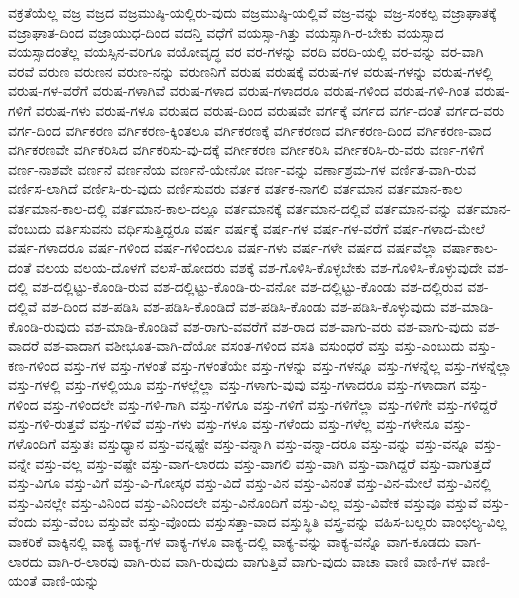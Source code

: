 {ವಕ್ರತೆಯೆಲ್ಲ
ವಜ್ರ
ವಜ್ರದ
ವಜ್ರಮುಷ್ಠಿ-ಯಲ್ಲಿರು-ವುದು
ವಜ್ರಮುಷ್ಠಿ-ಯಲ್ಲಿವೆ
ವಜ್ರ-ವನ್ನು
ವಜ್ರ-ಸಂಕಲ್ಪ
ವಜ್ರಾಘಾತಕ್ಕೆ
ವಜ್ರಾಘಾತ-ದಿಂದ
ವಜ್ರಾಯುಧ-ದಿಂದ
ವದನ್ತಿ
ವಧೆಗೆ
ವಯಸ್ಸಾ-ಗಿತ್ತು
ವಯಸ್ಸಾಗಿ-ರ-ಬೇಕು
ವಯಸ್ಸಾದ
ವಯಸ್ಸಾದಂತೆಲ್ಲ
ವಯಸ್ಸಿನ-ವರಿಗೂ
ವಯೋವೃದ್ಧ
ವರ
ವರ-ಗಳನ್ನು
ವರದಿ
ವರದಿ-ಯಲ್ಲಿ
ವರ-ವನ್ನು
ವರ-ವಾಗಿ
ವರವೆ
ವರುಣ
ವರುಣನ
ವರುಣ-ನನ್ನು
ವರುಣನಿಗೆ
ವರುಷ
ವರುಷಕ್ಕೆ
ವರುಷ-ಗಳ
ವರುಷ-ಗಳನ್ನು
ವರುಷ-ಗಳಲ್ಲಿ
ವರುಷ-ಗಳ-ವರೆಗೆ
ವರುಷ-ಗಳಾಗಿವೆ
ವರುಷ-ಗಳಾದ
ವರುಷ-ಗಳಾದರೂ
ವರುಷ-ಗಳಿಂದ
ವರುಷ-ಗಳಿ-ಗಿಂತ
ವರುಷ-ಗಳಿಗೆ
ವರುಷ-ಗಳು
ವರುಷ-ಗಳೂ
ವರುಷದ
ವರುಷ-ದಿಂದ
ವರುಷವೇ
ವರ್ಗಕ್ಕೆ
ವರ್ಗದ
ವರ್ಗ-ದಂತೆ
ವರ್ಗದ-ವರು
ವರ್ಗ-ದಿಂದ
ವರ್ಗಿಕರಣ
ವರ್ಗಿಕರಣ-ಕ್ಕಿಂತಲೂ
ವರ್ಗಿಕರಣಕ್ಕೆ
ವರ್ಗಿಕರಣದ
ವರ್ಗಿಕರಣ-ದಿಂದ
ವರ್ಗಿಕರಣ-ವಾದ
ವರ್ಗಿಕರಣವೇ
ವರ್ಗಿಕರಿಸಿದ
ವರ್ಗಿಕರಿಸು-ವು-ದಕ್ಕೆ
ವರ್ಗೀಕರಣ
ವರ್ಗೀಕರಿಸಿ
ವರ್ಗೀಕರಿಸಿ-ರು-ವರು
ವರ್ಣ-ಗಳಿಗೆ
ವರ್ಣ-ನಾಶವೇ
ವರ್ಣನೆ
ವರ್ಣನೆಯ
ವರ್ಣನೆ-ಯೇನೋ
ವರ್ಣ-ವನ್ನು
ವರ್ಣಾಶ್ರಮ-ಗಳ
ವರ್ಣಿತ-ವಾಗಿ-ರುವ
ವರ್ಣಿಸ-ಲಾಗಿದೆ
ವರ್ಣಿಸಿ-ರು-ವುದು
ವರ್ಣಿಸುವರು
ವರ್ತಕ
ವರ್ತಕ-ನಾಗಲಿ
ವರ್ತಮಾನ
ವರ್ತಮಾನ-ಕಾಲ
ವರ್ತಮಾನ-ಕಾಲ-ದಲ್ಲಿ
ವರ್ತಮಾನ-ಕಾಲ-ದಲ್ಲೂ
ವರ್ತಮಾನಕ್ಕೆ
ವರ್ತಮಾನ-ದಲ್ಲಿವೆ
ವರ್ತಮಾನ-ವನ್ನು
ವರ್ತಮಾನ-ವೆಂಬುದು
ವರ್ತಿಸುವನು
ವರ್ಧಿಸುತ್ತಿದ್ದರೂ
ವರ್ಷ
ವರ್ಷಕ್ಕೆ
ವರ್ಷ-ಗಳ
ವರ್ಷ-ಗಳ-ವರೆಗೆ
ವರ್ಷ-ಗಳಾದ-ಮೇಲೆ
ವರ್ಷ-ಗಳಾದರೂ
ವರ್ಷ-ಗಳಿಂದ
ವರ್ಷ-ಗಳಿಂದಲೂ
ವರ್ಷ-ಗಳು
ವರ್ಷ-ಗಳೇ
ವರ್ಷದ
ವರ್ಷವೆಲ್ಲಾ
ವರ್ಷಾಕಾಲ-ದಂತೆ
ವಲಯ
ವಲಯ-ದೊಳಗೆ
ವಲಸೆ-ಹೋದರು
ವಶಕ್ಕೆ
ವಶ-ಗೊಳಿಸಿ-ಕೊಳ್ಳಬೇಕು
ವಶ-ಗೊಳಿಸಿ-ಕೊಳ್ಳುವುದೇ
ವಶ-ದಲ್ಲಿ
ವಶ-ದಲ್ಲಿಟ್ಟು-ಕೊಂಡಿ-ರುವ
ವಶ-ದಲ್ಲಿಟ್ಟು-ಕೊಂಡಿ-ರು-ವನೋ
ವಶ-ದಲ್ಲಿಟ್ಟು-ಕೊಂಡು
ವಶ-ದಲ್ಲಿರುವ
ವಶ-ದಲ್ಲಿವೆ
ವಶ-ದಿಂದ
ವಶ-ಪಡಿಸಿ
ವಶ-ಪಡಿಸಿ-ಕೊಂಡಿದೆ
ವಶ-ಪಡಿಸಿ-ಕೊಂಡು
ವಶ-ಪಡಿಸಿ-ಕೊಳ್ಳುವುದು
ವಶ-ಮಾಡಿ-ಕೊಂಡಿ-ರುವುದು
ವಶ-ಮಾಡಿ-ಕೊಂಡಿವೆ
ವಶ-ರಾಗು-ವವರೆಗೆ
ವಶ-ರಾದ
ವಶ-ವಾಗು-ವರು
ವಶ-ವಾಗು-ವುದು
ವಶ-ವಾದರೆ
ವಶ-ವಾದಾಗ
ವಶೀಭೂತ-ವಾಗಿ-ದೆಯೋ
ವಸಂತ-ಗಳಿಂದ
ವಸತಿ
ವಸುಂಧರೆ
ವಸ್ತು
ವಸ್ತು-ಎಂಬುದು
ವಸ್ತು-ಕಣ-ಗಳಿಂದ
ವಸ್ತು-ಗಳ
ವಸ್ತು-ಗಳಂತೆ
ವಸ್ತು-ಗಳಂತೆಯೇ
ವಸ್ತು-ಗಳನ್ನು
ವಸ್ತು-ಗಳನ್ನೂ
ವಸ್ತು-ಗಳನ್ನೆಲ್ಲ
ವಸ್ತು-ಗಳನ್ನೆಲ್ಲಾ
ವಸ್ತು-ಗಳಲ್ಲಿ
ವಸ್ತು-ಗಳಲ್ಲಿಯೂ
ವಸ್ತು-ಗಳಲ್ಲೆಲ್ಲಾ
ವಸ್ತು-ಗಳಾಗು-ವುವು
ವಸ್ತು-ಗಳಾದರೂ
ವಸ್ತು-ಗಳಾದಾಗ
ವಸ್ತು-ಗಳಿಂದ
ವಸ್ತು-ಗಳಿಂದಲೇ
ವಸ್ತು-ಗಳಿ-ಗಾಗಿ
ವಸ್ತು-ಗಳಿಗೂ
ವಸ್ತು-ಗಳಿಗೆ
ವಸ್ತು-ಗಳಿಗೆಲ್ಲಾ
ವಸ್ತು-ಗಳಿಗೇ
ವಸ್ತು-ಗಳಿದ್ದರೆ
ವಸ್ತು-ಗಳಿ-ರುತ್ತವೆ
ವಸ್ತು-ಗಳಿವೆ
ವಸ್ತು-ಗಳು
ವಸ್ತು-ಗಳೂ
ವಸ್ತು-ಗಳೆಂದು
ವಸ್ತು-ಗಳೆಲ್ಲ
ವಸ್ತು-ಗಳೇನೂ
ವಸ್ತು-ಗಳೊಂದಿಗೆ
ವಸ್ತುತಃ
ವಸ್ತುಧ್ಯಾನ
ವಸ್ತು-ವನ್ನಷ್ಟೇ
ವಸ್ತು-ವನ್ನಾಗಿ
ವಸ್ತು-ವನ್ನಾ-ದರೂ
ವಸ್ತು-ವನ್ನು
ವಸ್ತು-ವನ್ನೂ
ವಸ್ತು-ವನ್ನೇ
ವಸ್ತು-ವಲ್ಲ
ವಸ್ತು-ವಷ್ಟೇ
ವಸ್ತು-ವಾಗ-ಲಾರದು
ವಸ್ತು-ವಾಗಲಿ
ವಸ್ತು-ವಾಗಿ
ವಸ್ತು-ವಾಗಿದ್ದರೆ
ವಸ್ತು-ವಾಗುತ್ತದೆ
ವಸ್ತು-ವಿಗೂ
ವಸ್ತು-ವಿಗೆ
ವಸ್ತು-ವಿ-ಗೋಸ್ಕರ
ವಸ್ತು-ವಿದೆ
ವಸ್ತು-ವಿನ
ವಸ್ತು-ವಿನಂತೆ
ವಸ್ತು-ವಿನ-ಮೇಲೆ
ವಸ್ತು-ವಿನಲ್ಲಿ
ವಸ್ತು-ವಿನಲ್ಲೇ
ವಸ್ತು-ವಿನಿಂದ
ವಸ್ತು-ವಿನಿಂದಲೇ
ವಸ್ತು-ವಿನೊಂದಿಗೆ
ವಸ್ತು-ವಿಲ್ಲ
ವಸ್ತು-ವಿವೇಕ
ವಸ್ತುವೂ
ವಸ್ತುವೆ
ವಸ್ತು-ವೆಂದು
ವಸ್ತು-ವೆಂಬ
ವಸ್ತುವೇ
ವಸ್ತು-ವೊಂದು
ವಸ್ತುಸತ್ತಾ-ವಾದ
ವಸ್ತುಸ್ಥಿತಿ
ವಸ್ತ್ರ-ವನ್ನು
ವಹಿಸ-ಬಲ್ಲರು
ವಾಂಛಲ್ಯ-ವಿಲ್ಲ
ವಾಕರಿಕೆ
ವಾಕ್ಕಿನಲ್ಲಿ
ವಾಕ್ಯ
ವಾಕ್ಯ-ಗಳ
ವಾಕ್ಯ-ಗಳೂ
ವಾಕ್ಯ-ದಲ್ಲಿ
ವಾಕ್ಯ-ವನ್ನು
ವಾಕ್ಯ-ವನ್ನೊ
ವಾಗ-ಕೂಡದು
ವಾಗ-ಲಾರದು
ವಾಗಿ-ರ-ಲಾರವು
ವಾಗಿ-ರುವ
ವಾಗಿ-ರುವುದು
ವಾಗುತ್ತಿವೆ
ವಾಗು-ವುದು
ವಾಚಾ
ವಾಣಿ
ವಾಣಿ-ಗಳ
ವಾಣಿ-ಯಂತೆ
ವಾಣಿ-ಯನ್ನು
}
